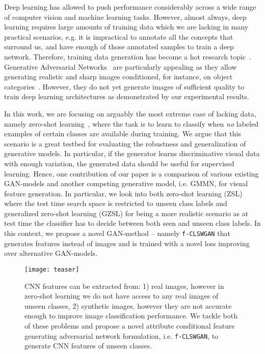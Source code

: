 \documentclass[10pt,twocolumn,letterpaper]{article}
\begin{document}
Deep learning has allowed to push performance considerably across a wide range of computer vision and machine learning tasks. However, almost always, deep learning requires large amounts of training data which we are lacking in many practical scenarios, e.g. it is impractical to annotate all the concepts that surround us, and have enough of those annotated samples to train a deep network.
Therefore, training data generation has become a hot research topic~\cite{chawla2002smote,GPMXWDOCB14,CK17,RAYLSL16,han2017stackgan,improvedgan}. Generative Adversarial Networks~\cite{GPMXWDOCB14} are particularly appealing as they allow generating realistic and sharp images conditioned, for instance, on object categories~\cite{RAYLSL16,han2017stackgan}. However, they do not yet generate images of sufficient quality to train deep learning architectures as demonstrated by our experimental results.


In this work, we are focusing on arguably the most extreme case of lacking data, namely zero-shot learning~\cite{LNH13,XSA17,CCGS16b}, where the task is to learn to classify when \textit{no} labeled examples of certain classes are available during training. We argue that this scenario is a great testbed for evaluating the robustness and generalization of generative models. In particular, if the generator learns discriminative visual data with enough variation, the generated data should be useful for supervised learning. Hence, one contribution of our paper is a comparison of various existing GAN-models and another competing generative model, i.e. GMMN, for visual feature generation. In particular, we look into both zero-shot learning (ZSL) where the test time search space is restricted to unseen class labels and generalized zero-shot learning (GZSL) for being a more realistic scenario as at test time the classifier has to decide between both seen and unseen class labels. In this context, we propose a novel GAN-method -- namely \texttt{f-CLSWGAN} that generates features instead of images and is trained with a novel loss improving over alternative GAN-models.






\begin{figure}[t]
	\centering
\texttt{[image: teaser]}
	\caption{CNN features can be extracted from: 1) real images, however in zero-shot learning we do not have access to any real images of unseen classes, 2) synthetic images, however they are not accurate enough to improve image classification performance. We tackle both of these problems and propose a novel attribute conditional feature generating adversarial network formulation, i.e. \texttt{f-CLSWGAN}, to generate CNN features of unseen classes.}\label{fig:teaser}
\end{figure}
\end{document}
